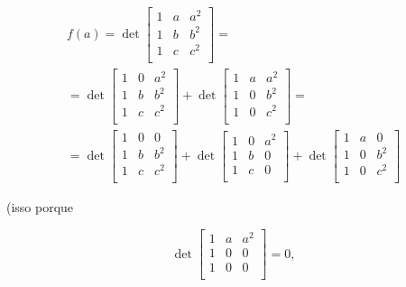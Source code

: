 \documentclass[leqno]{article}
\begin{document}
\begin{enumerate}
\begin{sol}
	\begin{equation*} 
		\begin{split} 
			f(a) = \det 
			\begin{bmatrix} 
				1 & a & a^{2} \\ 
				1 & b & b^{2} \\ 
				1 & c & c^{2} \\ 
			\end{bmatrix} = \\ 
			= \det 
			\begin{bmatrix} 
				1 & 0 & a^{2} \\ 
				1 & b & b^{2} \\ 
				1 & c & c^{2} \\ 
			\end{bmatrix} + 
			\det 
			\begin{bmatrix} 
				1 & a & a^{2} \\ 
				1 & 0 & b^{2} \\ 
				1 & 0 & c^{2} \\  
			\end{bmatrix} = \\ 
			= \det 
			\begin{bmatrix} 
				1 & 0 & 0 \\ 
				1 & b & b^{2} \\ 
				1 & c & c^{2} \\ 
			\end{bmatrix} + 
			\det 
			\begin{bmatrix} 
				1 & 0 & a^{2} \\ 
				1 & b & 0 \\ 
				1 & c & 0 \\ 
			\end{bmatrix} + 
			\det 
			\begin{bmatrix} 
				1 & a & 0 \\ 
				1 & 0 & b^{2} \\ 
				1 & 0 & c^{2} \\ 
			\end{bmatrix} 
		\end{split}    
	\end{equation*} 
	
	\noindent (isso porque 

	\begin{equation*} 
		\det 
		\begin{bmatrix} 
			1 & a & a^{2} \\ 
			1 & 0 & 0 \\ 
			1 & 0 & 0 \\ 
		\end{bmatrix} = 0, 
	\end{equation*} 


\end{sol}
\end{enumerate}
\end{document}
